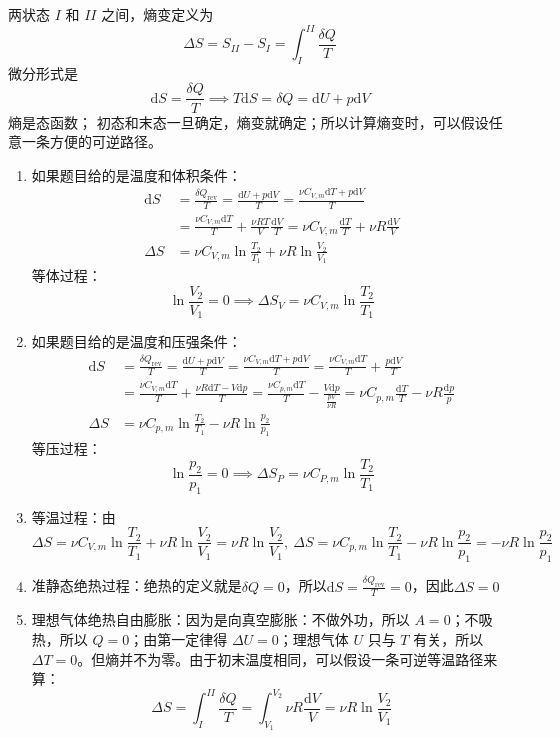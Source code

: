 \documentclass[lang=cn,11pt]{elegantbook}
\begin{document}
\begin{definition}[熵，熵变]
    两状态 \(I\) 和 \(II\) 之间，熵变定义为\[
\Delta S=S_{II}-S_I=\int_I^{II}\frac{\delta Q}{T}
\]微分形式是\[\mathrm dS=\frac{\delta Q}{T}\implies T\mathrm dS=\delta Q=\mathrm dU+p\mathrm dV\]熵是态函数；
初态和末态一旦确定，熵变就确定；所以计算熵变时，可以假设任意一条方便的可逆路径。
\begin{enumerate}
\item 如果题目给的是温度和体积条件：\begin{align*}
    \mathrm dS&=\frac{\delta Q_{\mathrm{rev}}}{T}=\frac{\mathrm dU+p\mathrm dV}{T}=\frac{\nu C_{V,m}\mathrm dT+p\mathrm dV}{T}\\
    &=\frac{\nu C_{V,m}\mathrm dT}{T}+\frac{\nu RT}{V}\frac{\mathrm dV}{T}=\nu C_{V,m}\frac{\mathrm dT}{T}+\nu R\frac{\mathrm dV}{V}\\
    \Delta S&=\nu C_{V,m}\ln\frac{T_2}{T_1}+\nu R\ln\frac{V_2}{V_1}
\end{align*}
等体过程：\[\ln\frac{V_2}{V_1}=0\implies\Delta S_V=\nu C_{V,m}\ln\frac{T_2}{T_1}\]
\item 如果题目给的是温度和压强条件：\begin{align*}
\mathrm dS&=\frac{\delta Q_{\mathrm{rev}}}{T}=\frac{\mathrm dU+p\mathrm dV}{T}=\frac{\nu C_{V,m}\mathrm dT+p\mathrm dV}{T}=\frac{\nu C_{V,m}\mathrm dT}{T}+\frac{p\mathrm dV}{T}\\
&=\frac{\nu C_{V,m}\mathrm dT}{T}+\frac{\nu R\mathrm dT-V\mathrm dp}{T}=\frac{\nu C_{p,m}\mathrm dT}{T}-\frac{V\mathrm dp}{\frac{pV}{\nu R}}=\nu C_{p,m}\frac{\mathrm dT}{T}-\nu R\frac{\mathrm dp}{p}\\
\Delta S&=\nu C_{p,m}\ln\frac{T_2}{T_1}-\nu R\ln\frac{p_2}{p_1}
\end{align*}
等压过程：\[\ln\frac{p_2}{p_1}=0\implies\Delta S_P=\nu C_{P,m}\ln\frac{T_2}{T_1}\]
\item 等温过程：由\[\Delta S=\nu C_{V,m}\ln\frac{T_2}{T_1}+\nu R\ln\frac{V_2}{V_1}=\nu R\ln\frac{V_2}{V_1},~\Delta S=\nu C_{p,m}\ln\frac{T_2}{T_1}-\nu R\ln\frac{p_2}{p_1}=-\nu R\ln\frac{p_2}{p_1}\]
\item 准静态绝热过程：绝热的定义就是\(\delta Q=0\)，所以\(\mathrm dS=\frac{\delta Q_{\mathrm{rev}}}{T}=0\)，因此\(\Delta S=0\)
\item 理想气体绝热自由膨胀：因为是向真空膨胀：不做外功，所以 \(A=0\)；不吸热，所以 \(Q=0\)；由第一定律得 \(\Delta U=0\)；理想气体 \(U\) 只与 \(T\) 有关，所以 \(\Delta T=0\)。但熵并不为零。由于初末温度相同，可以假设一条可逆等温路径来算：\[\Delta S=\int_I^{II}\frac{\delta Q}{T}=\int_{V_1}^{V_2}\nu R\frac{\mathrm dV}{V}=\nu R\ln\frac{V_2}{V_1}\]
\end{enumerate}
\end{definition}
\end{document}
